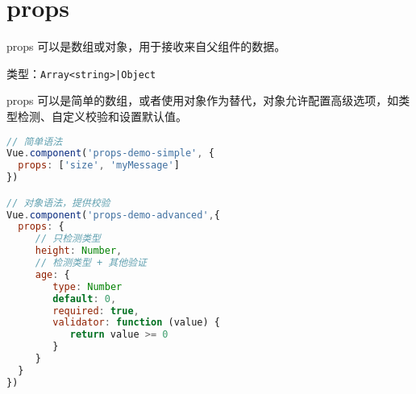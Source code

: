 \begin{lstlisting}[language=JavaScript]

\end{lstlisting}




\begin{lstlisting}[language=JavaScript]

\end{lstlisting}




\begin{lstlisting}[language=JavaScript]

\end{lstlisting}




\begin{lstlisting}[language=JavaScript]

\end{lstlisting}




\section{props}


props 可以是数组或对象，用于接收来自父组件的数据。

\begin{compactitem}
\item 类型：\texttt{Array<string>|Object}
\end{compactitem}



props 可以是简单的数组，或者使用对象作为替代，对象允许配置高级选项，如类型检测、自定义校验和设置默认值。


\begin{lstlisting}[language=JavaScript]
// 简单语法
Vue.component('props-demo-simple', {
  props: ['size', 'myMessage']
})

// 对象语法，提供校验
Vue.component('props-demo-advanced',{
  props: {
     // 只检测类型
     height: Number,
     // 检测类型 + 其他验证
     age: {
        type: Number
        default: 0,
        required: true,
        validator: function (value) {
           return value >= 0
        }
     }
  }
})
\end{lstlisting}




\begin{lstlisting}[language=JavaScript]

\end{lstlisting}




